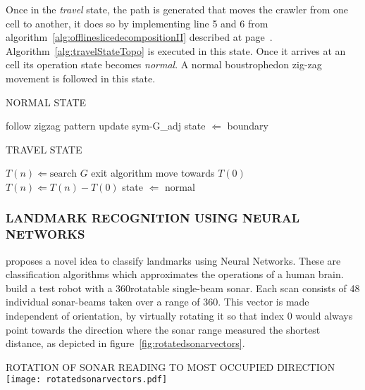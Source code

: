 Once in the \emph{travel} state, the path is generated that moves the crawler from one cell to another, it does so by
implementing line 5 and 6 from algorithm~\ref{alg:offlineslicedecompositionII} described at
page~\pageref{alg:offlineslicedecompositionII}. Algorithm~\ref{alg:travelStateTopo} is executed in this state. Once it
arrives at an cell its operation state becomes \emph{normal}. A normal boustrophedon zig-zag movement is followed in
this state.

\begin{RoyalAlgorithm}[label=alg:normalStateTopo]{NORMAL STATE}
	\begin{algorithmic}[1]
		\Repeat
			\State follow zigzag pattern
		\State update \gls{sym-G_adj}
		\State state $ \Leftarrow $ boundary
		\EndProcedure
	\end{algorithmic}
\end{RoyalAlgorithm}

\begin{RoyalAlgorithm}[label=alg:travelStateTopo]{TRAVEL STATE}
	\begin{algorithmic}[1]
		\State $ T(n) \Leftarrow \text{search } G $
			\State exit algorithm
		\EndIf
			\State move towards $ T(0) $
				$ T(n) \Leftarrow T(n) - { T(0) } $
			\EndIf
		\EndWhile
		\State state $ \Leftarrow $ normal
		\EndProcedure
	\end{algorithmic}
\end{RoyalAlgorithm}

\subsubsection{LANDMARK RECOGNITION USING NEURAL NETWORKS}
\citet{wong_qualitative_2006} proposes a novel idea to classify landmarks using Neural Networks. These are
classification algorithms which approximates the operations of a human brain. \citeauthor{wong_qualitative_2006} build a
test robot with a 360\textdegree rotatable single-beam sonar. Each scan consists of 48 individual sonar-beams taken over
a range of 360\textdegree. This vector is made independent of orientation, by virtually rotating it so that index 0
would always point towards the direction where the sonar range measured the shortest distance, as depicted in
figure~\ref{fig:rotatedsonarvectors}.

\begin{RoyalFigure}[!htb, label=fig:rotatedsonarvectors]{ROTATION OF SONAR READING TO MOST OCCUPIED DIRECTION~\cite{wong_qualitative_2006}}
	\texttt{[image: rotatedsonarvectors.pdf]}
\end{RoyalFigure}

